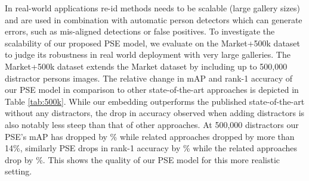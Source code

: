 \documentclass[10pt,twocolumn,letterpaper]{article}
\begin{document}
 In real-world applications re-id methods needs to be scalable (large gallery sizes) and are used in combination with automatic person detectors which can generate errors, such as mis-aligned detections or false positives. To investigate the scalability of our proposed PSE model, we evaluate on the Market+500k dataset to judge its robustness in real world deployment with very large galleries. The Market+500k dataset extends the Market dataset by including up to 500,000 distractor persons images. The relative change in mAP and rank-1 accuracy of our PSE model in comparison to other state-of-the-art approaches is depicted in Table \ref{tab:500k}.
While our embedding outperforms the published state-of-the-art without any distractors, the drop in accuracy observed when adding distractors is also notably less steep than that of other approaches. At 500,000 distractors our PSE's mAP has dropped by \% while related approaches dropped by more than 14\%, similarly PSE drops in rank-1 accuracy by \% while the related approaches drop by \%. This shows the quality of our PSE model for this more realistic setting.
\iffalse
\begin{figure}
\centering
\vspace{-.2cm}
\texttt{[image: images/FigureMarket500k]}
    \caption{Performance of PSE at increasing gallery sizes. Solid lines: Rank-1; Dashed lines: mAP. The improved scalability is indicated by the less steep drop of the PSE curves in comparison to those of related approaches.}
\label{fig:500k}
\end{figure}
\fi
\end{document}
